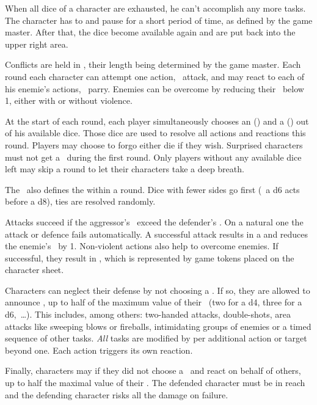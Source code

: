 {		When all dice of a character are exhausted, he can't accomplish any more tasks. The character has to  and pause for a short period of time, as defined by the game master. After that, the dice become available again and are put back into the upper right area.


		\noindent
		Conflicts are held in , their length being determined by the game master. Each round each character can attempt one action, \eg\ attack, and may react to each of his enemie's actions, \eg\ parry. Enemies can be overcome by reducing their \HD\ below 1, either with or without violence.

		At the start of each round, each player simultaneously chooses an  (\AD) and a  (\RD) out of his available dice. Those dice are used to resolve all actions and reactions this round. Players may choose to forgo either die if they wish. Surprised characters must not get a \AD\ during the first round. Only players without any available dice left may skip a round to let their characters take a deep breath.

		The \AD\ also defines the  within a round. Dice with fewer sides go first (\eg\ a d6 acts before a d8), ties are resolved randomly.

		Attacks succeed if the aggressor's \AD\ exceed the defender's \RD. On a natural one the attack or defence fails automatically. A successful attack results in a  and reduces the enemie's \HD\ by 1. Non-violent actions also help to overcome enemies. If successful, they result in , which is represented by game tokens placed on the character sheet.

		Characters can neglect their defense by not choosing a \RD. If so, they are allowed to announce , up to half of the maximum value of their \AD~(two for a d4, three for a d6,~\ldots). This includes, among others: two-handed attacks, double-shots, area attacks like sweeping blows or fireballs, intimidating groups of enemies or a timed sequence of other tasks. \emph{All} tasks are modified by  per additional action or target beyond one. Each action triggers its own reaction.

		Finally, characters may  if they did not choose a \AD\ and react on behalf of others, up to half the maximal value of their \RD. The defended character must be in reach and the defending character risks all the damage on failure.

}
